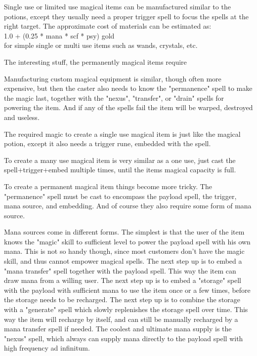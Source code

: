 Single use or limited use magical items can be manufactured similar to the potions, except they usually need a proper trigger spell to focus the spells at the right target.
The approximate cost of materials can be estimated as: \\
1.0 + (0.25 * mana * scf * psy) gold \\
for simple single or multi use items such as wands, crystals, etc.

The interesting stuff, the permanently magical items require



Manufacturing custom magical equipment is similar, though often more expensive, but then the caster also needs to know the "permanence" spell to make the magic last, together with the "nexus", "transfer", or "drain" spells for powering the item. And if any of the spells fail the item will be warped, destroyed and useless.

The required magic to create a single use magical item is just like the magical potion, except it also needs a trigger rune, embedded with the spell.

To create a many use magical item is very similar as a one use, just cast the spell+trigger+embed multiple times, until the items magical capacity is full.

To create a permanent magical item things become more tricky. The "permanence" spell must be cast to encompass the payload spell, the trigger, mana source, and embedding. And of course they also require some form of mana source.

Mana sources come in different forms. The simplest is that the user of the item knows the "magic" skill to sufficient level to power the payload spell with his own mana. This is not so handy though, since most customers don't have the magic skill, and thus cannot empower magical spells.
The next step up is to embed a "mana transfer" spell together with the payload spell. This way the item can draw mana from a willing user.
The next step up is to embed a "storage" spell with the payload with sufficient mana to use the item once or a few times, before the storage needs to be recharged.
The next step up is to combine the storage with a "generate" spell which slowly replenishes the storage spell over time. This way the item will recharge by itself, and can still be manually recharged by a mana transfer spell if needed.
The coolest and ultimate mana supply is the "nexus" spell, which always can supply mana directly to the payload spell with high frequency ad infinitum.

